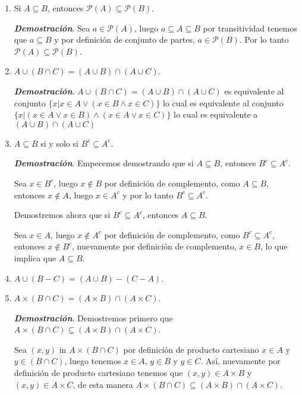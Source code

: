 \documentclass{report}
\begin{document}
\begin{enumerate}
\begin{enumerate}
            \item Si $A \subseteq B$, entonces $\mathcal{P}(A) \subseteq \mathcal{P}(B)$.

            \textit{\textbf{Demostración}}. Sea $a \in \mathcal{P}(A)$, luego $a \subseteq A \subseteq B$ por transitividad tenemos que $a \subseteq B$ y por definición de conjunto de partes, $a \in \mathcal{P}(B)$. Por lo tanto $\mathcal{P}(A) \subseteq \mathcal{P}(B)$.

            \item $A \cup (B \cap C) = (A \cup B) \cap (A \cup C)$.

            \textit{\textbf{Demostración}}. $A \cup (B \cap C) = (A \cup B) \cap (A \cup C)$ es equivalente al conjunto $\{x |x\in A  \lor (x\in B \land x\in C)\}$ lo cual es equivalente al conjunto $\{x|(x \in A \lor x \in B) \land (x \in A \lor x \in C)\}$ lo cual es equivalente a $(A \cup B)\cap (A \cup C)$

            \item $A \subseteq B$ si y solo si $B^c \subseteq A^c$.

            \textit{\textbf{Demostración}}. Empecemos demostrando que si $A \subseteq B$, entonces $B^c \subseteq A^c$.

            Sea $x \in B^c$, luego $x \not \in B$ por definición de complemento, como $A \subseteq B$, entonces $x \not \in A$, luego $x \in A^c$ y por lo tanto $B^c \subseteq A^c$.

            Demostremos ahora que si $B^c \subseteq A^c$, entonces $A \subseteq B$.

            Sea $x \in A$, luego $x \not \in A^c$ por definición de complemento, como $B^c \subseteq A^c$, entonces $x \not \in B^c$, nuevamente por definición de complemento, $x \in B$, lo que implica que $A \subseteq B$.

            \item $A \cup (B - C) = (A \cup B) - (C - A)$.
            \item $A \times (B \cap C) = (A \times B) \cap (A \times C)$.

            \textit{\textbf{Demostración}}. Demostremos primero que $A \times (B \cap C) \subseteq (A \times B) \cap (A \times C)$.

            Sea $(x, y)$ in $A \times (B\cap C)$ por definición de producto cartesiano $x \in A$ y $y \in (B\cap C)$, luego tenemos $x \in A$, $y \in B$ y $y \in C$. Así, nuevamente por definición de producto cartesiano tenemos que $(x, y) \in A \times B$ y $(x, y) \in A \times C$, de esta manera $A \times (B \cap C) \subseteq (A \times B) \cap (A \times C)$.


\end{enumerate}
\end{enumerate}
\end{document}
